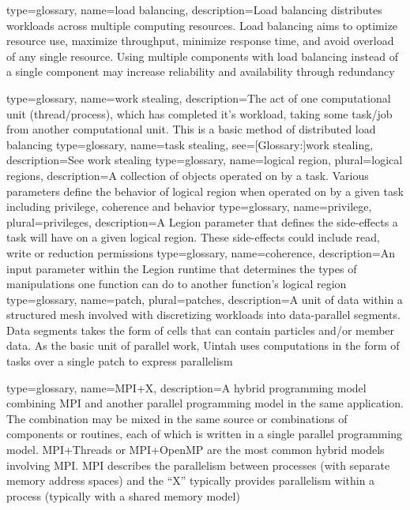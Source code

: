 {
  type={glossary},
  name={load balancing},
  description={Load balancing distributes workloads across multiple
  computing resources. Load balancing aims to optimize resource use,
  maximize throughput, minimize response time, and avoid overload of
  any single resource. Using multiple components with load balancing
  instead of a single component may increase reliability and
  availability through redundancy}  
}

{
  type={glossary},
  name={work stealing},
  description={The act of one computational unit (thread/process), which has completed it's workload, taking some task/job from another computational unit. This is a basic method of distributed load balancing}
}
{
  type={glossary},
  name={task stealing},
  see={[Glossary:]{work stealing}},
  description={See \gls{work stealing}}
}
{
  type={glossary},
  name={logical region},
  plural={logical regions},
  description={A collection of objects operated on by a task. Various parameters define the behavior of logical region when operated on by a given task including privilege, coherence and behavior}
}
{
  type={glossary},
  name={privilege},
  plural={privileges},
  description={A Legion parameter that defines the side-effects a task will have on a given logical region. These side-effects could include read, write or reduction permissions}
}
{
  type={glossary},
  name={coherence},
  description={An input parameter within the Legion runtime that determines the types of manipulations one function can do to another function's logical region}
}
{
  type={glossary},
  name={patch},
  plural={patches},
  description={A unit of data within a structured mesh involved with discretizing workloads into data-parallel segments. Data segments takes the form of cells that can contain particles and/or member data. As the basic unit of parallel work, Uintah uses computations in the form of tasks over a single patch to express parallelism}
}

{
  type={glossary},
  name={MPI+X},
  description={A hybrid \gls{programming model} combining \gls{MPI} and
  another parallel \gls{programming model} in the same application. The
  combination may be mixed in the same source or combinations of
  components or routines, each of which is written in a single parallel
  \gls{programming model}. \gls{MPI}+Threads or \gls{MPI}+OpenMP are the most
  common hybrid models involving \gls{MPI}. \gls{MPI} describes the
  parallelism between processes (with separate memory address spaces) and
  the ``X'' typically provides parallelism within a process (typically
  with a shared \gls{memory model})}
}

